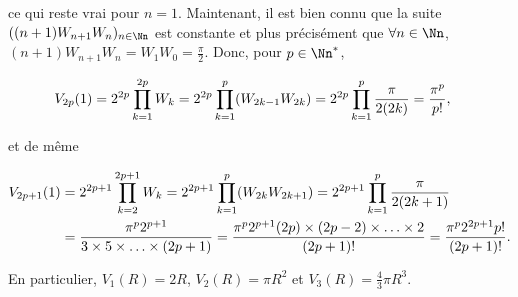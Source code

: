 {{ ce qui reste vrai pour $n=1$. Maintenant, il est bien connu que la suite $((n+1)W_{n+1}W_n)_{n\in\Nn}$ est constante et plus précisément que $\forall n\in\Nn$, $(n+1)W_{n+1}W_n=W_1W_0= \frac{\pi}{2}$. Donc, pour $p\in\Nn^*$,

\begin{align*}\ensuremath
V_{2p}(1)&=2^{2p}\prod_{k=1}^{2p}W_k=2^{2p}\prod_{k=1}^{p}(W_{2k-1}W_{2k})=2^{2p}\prod_{k=1}^{p} \frac{\pi}{2(2k)}= \frac{\pi^p}{p!},
\end{align*}

et de même

\begin{align*}\ensuremath
V_{2p+1}(1)&=2^{2p+1}\prod_{k=2}^{2p+1}W_k=2^{2p+1}\prod_{k=1}^{p}(W_{2k}W_{2k+1})=2^{2p+1}\prod_{k=1}^{p} \frac{\pi}{2(2k+1)}\\
 &= \frac{\pi^p2^{p+1}}{3\times5\times\ldots\times(2p+1)}= \frac{\pi^p2^{p+1}(2p)\times(2p-2)\times\ldots\times2}{(2p+1)!}= \frac{\pi^p2^{2p+1}p!}{(2p+1)!}.
\end{align*}

\begin{center}
\end{center}

En particulier, $V_1(R)=2R$, $V_2(R)=\pi R^2$ et $V_3(R)= \frac{4}{3}\pi R^3$.}
}
